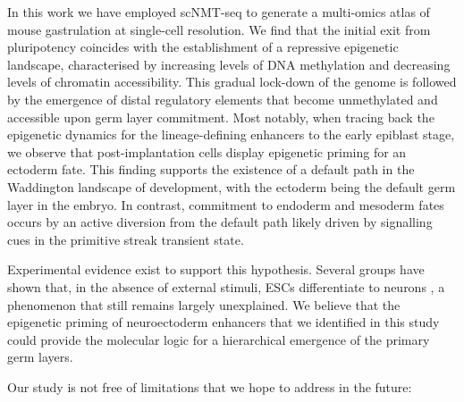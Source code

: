 In this work we have employed scNMT-seq to generate a multi-omics atlas of mouse gastrulation at single-cell resolution. We find that the initial exit from pluripotency coincides with the establishment of a repressive epigenetic landscape, characterised by increasing levels of DNA methylation and decreasing levels of chromatin accessibility. This gradual lock-down of the genome is followed by the emergence of distal regulatory elements that become unmethylated and accessible upon germ layer commitment. Most notably, when tracing back the epigenetic dynamics for the lineage-defining enhancers to the early epiblast stage, we observe that post-implantation cells display epigenetic priming for an ectoderm fate. This finding supports the existence of a default path in the Waddington landscape of development, with the ectoderm being the default germ layer in the embryo. In contrast, commitment to endoderm and mesoderm fates occurs by an active diversion from the default path likely driven by signalling cues in the primitive streak transient state.

Experimental evidence exist to support this hypothesis. Several groups have shown that, in the absence of external stimuli, ESCs differentiate to neurons \cite{Munoz2002,Hemmati-Brivanlou1997}, a phenomenon that still remains largely unexplained. We believe that the epigenetic priming of neuroectoderm enhancers that we identified in this study could provide the molecular logic for a hierarchical emergence of the primary germ layers. 

Our study is not free of limitations that we hope to address in the future:

